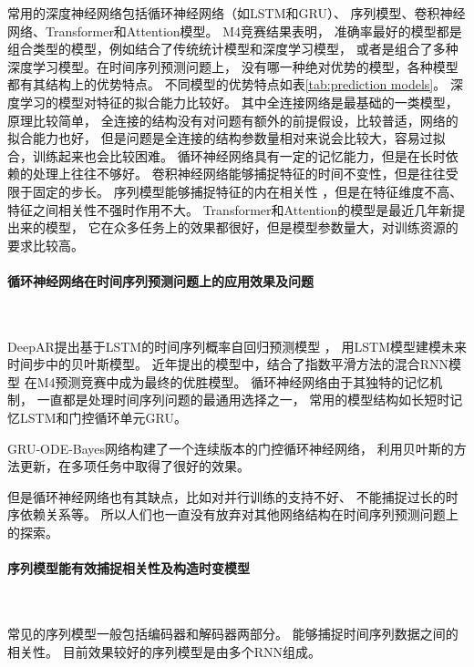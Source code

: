   常用的深度神经网络包括循环神经网络（如LSTM和GRU）、
  序列模型、卷积神经网络、Transformer和Attention模型。
  M4竞赛结果表明\cite{MAKRIDAKIS202054}，
  准确率最好的模型都是组合类型的模型，例如结合了传统统计模型和深度学习模型，
  或者是组合了多种深度学习模型。在时间序列预测问题上，
  没有哪一种绝对优势的模型，各种模型都有其结构上的优势特点。
  不同模型的优势特点如表\ref{tab:prediction models}。
  深度学习的模型对特征的拟合能力比较好。
  其中全连接网络是最基础的一类模型，原理比较简单，
  全连接的结构没有对问题有额外的前提假设，比较普适，网络的拟合能力也好，
  但是问题是全连接的结构参数量相对来说会比较大，容易过拟合，训练起来也会比较困难。
  循环神经网络具有一定的记忆能力，但是在长时依赖的处理上往往不够好。
  卷积神经网络能够捕捉特征的时间不变性，但是往往受限于固定的步长。
  序列模型能够捕捉特征的内在相关性 ，但是在特征维度不高、特征之间相关性不强时作用不大。
  Transformer和Attention的模型是最近几年新提出来的模型，
  它在众多任务上的效果都很好，但是模型参数量大，对训练资源的要求比较高。

  \paragraph{循环神经网络在时间序列预测问题上的应用效果及问题}~{}

    DeepAR提出基于LSTM的时间序列概率自回归预测模型
    \cite{salinas2020deepar}，
    用LSTM模型建模未来时间步中的贝叶斯模型。
    近年提出的模型中，结合了指数平滑方法的混合RNN模型\cite{smyl2020hybrid}
    在M4预测竞赛中成为最终的优胜模型\cite{MAKRIDAKIS202054}。
    循环神经网络由于其独特的记忆机制\cite{hewamalage2021recurrent}，
    一直都是处理时间序列问题的最通用选择之一，
    常用的模型结构如长短时记忆LSTM和门控循环单元GRU。

    GRU-ODE-Bayes网络\cite{de2019gru}构建了一个连续版本的门控循环神经网络，
    利用贝叶斯的方法更新，在多项任务中取得了很好的效果。

    但是循环神经网络也有其缺点，比如对并行训练的支持不好、
    不能捕捉过长的时序依赖关系等。
    所以人们也一直没有放弃对其他网络结构在时间序列预测问题上的探索。

  \paragraph{序列模型能有效捕捉相关性及构造时变模型}~{}

    常见的序列模型一般包括编码器和解码器两部分。
    能够捕捉时间序列数据之间的相关性。
    目前效果较好的序列模型是由多个RNN组成。

